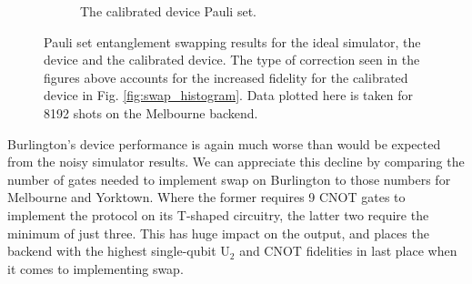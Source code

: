 \begin{figure}[h!]
\begin{subfigure}{.5\textwidth}
		\caption{The calibrated device Pauli set.}
		\label{fig:swap_pauli_dev}
	\end{subfigure}
	\caption{ Pauli set entanglement swapping results for the ideal simulator, the
		device and the calibrated device. The type of correction seen in the figures
		above accounts for the increased fidelity for the calibrated device in Fig.
		\ref{fig:swap_histogram}. Data plotted here is taken for 8192 shots on the
		Melbourne backend.}
	\label{fig:swap_paulis}
\end{figure}
Burlington's device performance is again much worse than would be
expected from the noisy simulator results. We can appreciate this decline by
comparing the number of gates needed to implement swap on Burlington to those
numbers for Melbourne and Yorktown. Where the former requires 9 CNOT gates to
implement the protocol on its T-shaped circuitry, the latter two require the
minimum of just three. This has huge impact on the output, and places the
backend with the highest single-qubit U$_2$ and CNOT fidelities in last place
when it comes to implementing swap. 


